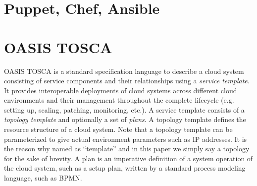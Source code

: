 \documentclass[12pt]{report}
\begin{document}
\section{Puppet, Chef, Ansible}
\label{sec:PCA}

\section{OASIS TOSCA}
\label{sec:TOSCA}
OASIS TOSCA\cite{TOSCA} is a standard specification language to
describe a cloud system consisting of service components and their
relationships using a {\it service template}. It provides
interoperable deployments of cloud systems across different cloud
environments and their management throughout the complete lifecycle
(e.g. setting up, scaling, patching, monitoring, etc.).  A service
template consists of a {\it topology template} and optionally a set of
{\it plans}. A topology template defines the resource structure of a
cloud system. Note that a topology template can be parameterized
to give actual environment parameters such as IP addresses. It is the
reason why named as ``template'' and in this paper we simply say a
topology for the sake of brevity. A plan is an imperative definition
of a system operation of the cloud system, such as a setup plan,
written by a standard process modeling language, such as BPMN.
\end{document}
